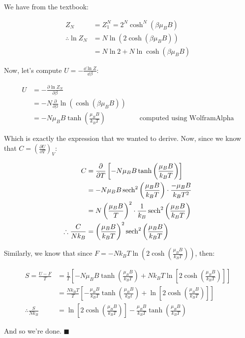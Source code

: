 \documentclass[10pt]{article}
\begin{document}
    \begin{solution} 
        We have from the textbook:

        \begin{align*}
            Z_N &= Z_1^N = 2^{N} \cosh^N( \beta \mu_BB)\\
            \therefore \ln Z_N &= N \ln (2 \cosh (\beta \mu_BB))\\
            &= N \ln 2 + N \ln \cosh(\beta \mu_BB)
        \end{align*}

        Now, let's compute $U = -\frac{\dd \ln Z}{\dd \beta}$: 

        \begin{align*}
            U &= -\frac{\partial \ln Z_N}{\partial \beta}\\
            &= -N \frac{\partial}{\partial \beta} \ln (\cosh(\beta \mu_BB))\\
            &= -N \mu_BB \tanh\left(\frac{\mu_BB}{k_BT}\right) && \text{ computed using WolframAlpha}
        \end{align*}

        Which is exactly the expression that we wanted to derive. Now, since we know that $C = \left(\frac{\partial U}{\partial T}\right)_V$:

        \begin{align*}
            C &= \frac{\partial}{\partial T}\left[- N\mu_B B\tanh\left(\frac{\mu_BB}{k_BT}\right)\right]\\
            &= -N\mu_BB \sech^2\left(\frac{\mu_BB}{k_BT}\right) \cdot \frac{-\mu_BB}{k_BT^2}\\
            &= N \left(\frac{\mu_BB}{T}\right)^2 \cdot \frac{1}{k_B} \sech^2\left(\frac{\mu_BB}{k_BT}\right)\\
            \therefore \frac{C}{Nk_B} &= \left(\frac{\mu_BB}{k_BT}\right)^2 \sech^2\left(\frac{\mu_BB}{k_BT}\right)
        \end{align*}

        Similarly, we know that since $F = -Nk_BT \ln \left( 2\cosh\left(\frac{\mu_BB}{k_BT}\right)\right)$, then:

        \begin{align*}
            S = \frac{U - F}{T} &= \frac{1}{T} \left[ -N\mu_BB \tanh\left(\frac{\mu_BB}{k_BT}\right) + Nk_BT \ln \left[2\cosh\left(\frac{\mu_BB}{k_BT}\right) \right]\right]\\
            &= \frac{Nk_BT}{T} \left[-\frac{\mu_BB}{k_BT}\tanh\left(\frac{\mu_BB}{k_Bt}\right) + \ln \left[2\cosh\left(\frac{\mu_BB}{k_BT}\right)\right]\right]\\
            \therefore \frac{S}{Nk_B} &= \ln \left[2\cosh \left(\frac{\mu_BB}{k_BT}\right)\right] - \frac{\mu_BB}{k_BT} \tanh \left(\frac{\mu_BB}{k_BT}\right)
        \end{align*}

        And so we're done. $\blacksquare$
    \end{solution}
\end{document}
